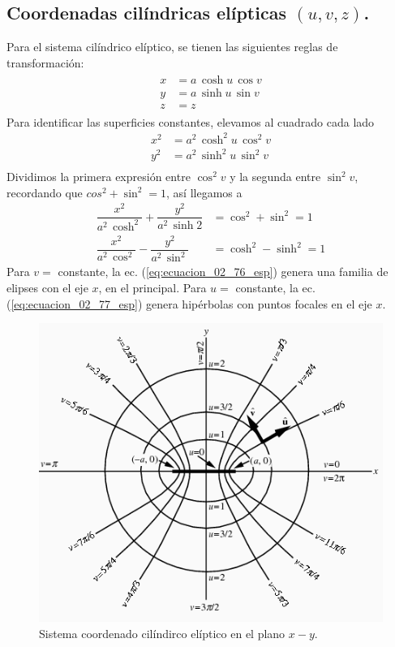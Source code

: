  \subsection{Coordenadas cilíndricas elípticas \texorpdfstring{$(u, v, z)$}{(u, v, z)}.}
 
 Para el sistema cilíndrico elíptico, se tienen las siguientes reglas de transformación:
\begin{align}
\begin{aligned}
x &= a \, \cosh u \, \cos v \\
y &= a \, \sinh u \, \sin v \\
z &= z
\end{aligned}
\label{eq:ecuacion_02_73_esp}
\end{align}
Para identificar las superficies constantes, elevamos al cuadrado cada lado
\begin{align}
x^{2} &= a^{2} \, \cosh^{2} u \, \cos^{2} v \label{eq:ecuacion_02_74_esp} \\
y^{2} &= a^{2} \, \sinh^{2} u \, \sin^{2} v \label{eq:ecuacion_02_75_esp} \\ 
\end{align}
Dividimos la primera expresión entre $\cos^{2} v$ y la segunda entre $\sin^{2} v$, recordando que $cos^{2} + \sin^{2} = 1$, así llegamos a
\begin{align}
\dfrac{x^{2}}{a^{2} \, \cosh^{2}} + \dfrac{y^{2}}{a^{2} \, \sinh{2}} &= \cos^{2} + \sin^{2} = 1 \label{eq:ecuacion_02_76_esp}\\[1em]
\dfrac{x^{2}}{a^{2} \, \cos^{2}} - \dfrac{y^{2}}{a^{2} \, \sin^{2}} &= \cosh^{2} - \sinh^{2} = 1 \label{eq:ecuacion_02_77_esp}
\end{align}
Para $v=$ constante, la ec. (\ref{eq:ecuacion_02_76_esp}) genera una familia de elipses con el eje $x$, en el principal. Para $u=$ constante, la ec. (\ref{eq:ecuacion_02_77_esp}) genera hipérbolas con puntos focales en el eje $x$.
\begin{figure}[H]
    \centering
    \includegraphics[scale=0.75]{Imagenes/EllipticCylindricalCoord_1000.png}
    \caption{Sistema coordenado cilíndirco elíptico en el plano $x-y$.}
    \label{fig:figura_coordenada_cilindricas_elipticas}
\end{figure}
